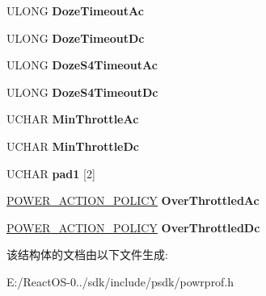 \begin{DoxyCompactItemize}
U\+L\+O\+NG {\bfseries Doze\+Timeout\+Ac}
\item 
\mbox{\label{struct___m_a_c_h_i_n_e___p_o_w_e_r___p_o_l_i_c_y_a3be9ab4644a360d4f129ed6c78506383}} 
U\+L\+O\+NG {\bfseries Doze\+Timeout\+Dc}
\item 
\mbox{\label{struct___m_a_c_h_i_n_e___p_o_w_e_r___p_o_l_i_c_y_aaef796d9abc6a65d64cacb18e1339b79}} 
U\+L\+O\+NG {\bfseries Doze\+S4\+Timeout\+Ac}
\item 
\mbox{\label{struct___m_a_c_h_i_n_e___p_o_w_e_r___p_o_l_i_c_y_ae8eefbe3206bcf19d964cf5b0c72bc9d}} 
U\+L\+O\+NG {\bfseries Doze\+S4\+Timeout\+Dc}
\item 
\mbox{\label{struct___m_a_c_h_i_n_e___p_o_w_e_r___p_o_l_i_c_y_a1c952743a697bd45798e6d9d3b311106}} 
U\+C\+H\+AR {\bfseries Min\+Throttle\+Ac}
\item 
\mbox{\label{struct___m_a_c_h_i_n_e___p_o_w_e_r___p_o_l_i_c_y_a05da5f18b01394bad64cf4376a040843}} 
U\+C\+H\+AR {\bfseries Min\+Throttle\+Dc}
\item 
\mbox{\label{struct___m_a_c_h_i_n_e___p_o_w_e_r___p_o_l_i_c_y_ad14df1acf9301388c47a14bb8ec4cdad}} 
U\+C\+H\+AR {\bfseries pad1} \mbox{[}2\mbox{]}
\item 
\mbox{\label{struct___m_a_c_h_i_n_e___p_o_w_e_r___p_o_l_i_c_y_aca09f2f472a7fe4f4783464d58ec4721}} 
\hyperlink{struct___p_o_w_e_r___a_c_t_i_o_n___p_o_l_i_c_y}{P\+O\+W\+E\+R\+\_\+\+A\+C\+T\+I\+O\+N\+\_\+\+P\+O\+L\+I\+CY} {\bfseries Over\+Throttled\+Ac}
\item 
\mbox{\label{struct___m_a_c_h_i_n_e___p_o_w_e_r___p_o_l_i_c_y_a7c46313cec31a858a6848ee8f08fa428}} 
\hyperlink{struct___p_o_w_e_r___a_c_t_i_o_n___p_o_l_i_c_y}{P\+O\+W\+E\+R\+\_\+\+A\+C\+T\+I\+O\+N\+\_\+\+P\+O\+L\+I\+CY} {\bfseries Over\+Throttled\+Dc}
\end{DoxyCompactItemize}


该结构体的文档由以下文件生成\+:\begin{DoxyCompactItemize}
\item 
E\+:/\+React\+O\+S-\/0../sdk/include/psdk/powrprof.\+h\end{DoxyCompactItemize}
